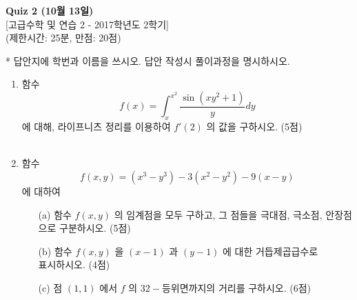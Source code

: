 \documentclass[12pt]{article}
\begin{document}
\begin{center}
\textbf{Quiz 2 (10월 13일)}\\
{[고급수학 및 연습 2 - 2017학년도 2학기]}\\
(제한시간: 25분, 만점: 20점)\\
\end{center}

* 답안지에 학번과 이름을 쓰시오. 답안 작성시 풀이과정을 명시하시오.\\

\begin{enumerate}
\item 함수 $$f(x)=\int_{x}^{x^2}\frac{\sin (xy^2+1)}{y}dy$$ 에 대해, 라이프니츠 정리를 이용하여 $f'(2)$ 의 값을 구하시오. (5점)
~\\\\
\item 함수 $$f(x, y)=(x^3-y^3)-3(x^2-y^2)-9(x-y)$$ 에 대하여
\begin{itemize}
	\item[(a)] 함수 $f(x, y)$ 의 임계점을 모두 구하고, 그 점들을 극대점, 극소점, 안장점으로 구분하시오. (5점)
	\item[(b)] 함수 $f(x, y)$ 을 $(x-1)$ 과 $(y-1)$ 에 대한 거듭제곱급수로 \\표시하시오. (4점)
	\item[(c)] 점 $(1, 1)$ 에서 $f$ 의 $32-$등위면까지의 거리를 구하시오. (6점)
\end{itemize}


\end{enumerate}
\end{document}
